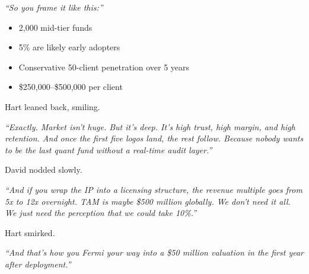 \textit{``So you frame it like this:''}

\begin{itemize}
  \item 2{,}000 mid-tier funds  
  \item 5\% are likely early adopters  
  \item Conservative 50-client penetration over 5 years  
  \item \$250{,}000–\$500{,}000 per client
\end{itemize}

Hart leaned back, smiling.

\textit{``Exactly. Market isn’t huge. But it’s deep. It's high trust, high margin, and high retention.  
And once the first five logos land, the rest follow.  
Because nobody wants to be the last quant fund without a real-time audit layer.''}

David nodded slowly.

\textit{``And if you wrap the IP into a licensing structure, the revenue multiple goes from 5x to 12x overnight.  
TAM is maybe \$500 million globally. We don’t need it all. We just need the perception that we could take 10\%.''}

Hart smirked.

\textit{``And that’s how you Fermi your way into a \$50 million valuation in the first year after deployment.''}


\medskip

